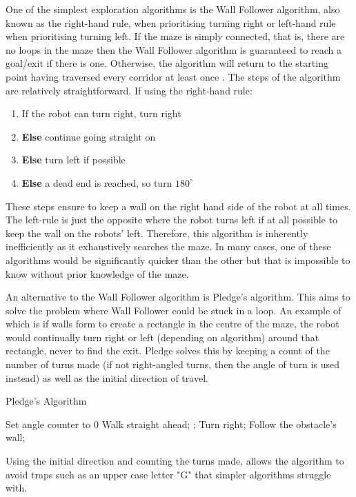 One of the simplest exploration algorithms is the Wall Follower algorithm, 
also known as the right-hand rule, when prioritising turning right or 
left-hand rule when prioritising turning left. If the maze is simply 
connected, that is, there are no loops in the maze then the Wall Follower 
algorithm is guaranteed to reach a goal/exit if there is one. Otherwise, the 
algorithm will return to the starting point having traversed every corridor at 
least once \cite{wallFollowerArcBotics}. The steps of the algorithm are 
relatively straightforward. If using the right-hand rule:
\begin{enumerate}
\item If the robot can turn right, turn right
\item \textbf{Else} continue going straight on
\item \textbf{Else} turn left if possible
\item \textbf{Else} a dead end is reached, so turn $180^{\circ}$
\end{enumerate}
These steps ensure to keep a wall on the right hand side of the robot at 
all times. The left-rule is just the opposite where the robot turns left 
if at all possible to keep the wall on the robots' left. Therefore,
this algorithm is inherently inefficiently as it exhaustively searches the
maze. In many cases, one of these algorithms would be significantly quicker
than the other but that is impossible to know without prior knowledge of 
the maze.

An alternative to the Wall Follower algorithm is Pledge's algorithm. This
aims to solve the problem where Wall Follower could be stuck in a loop. An 
example of which is if walls form to create a rectangle in the centre of 
the maze, the robot would continually turn right or left (depending on
algorithm) around that rectangle, never to find the exit. Pledge solves this
by keeping a count of the number of turns made (if not right-angled turns,
then the angle of turn is used instead) as well as the initial direction of
travel. \cite{klein2011pledge}

\begin{algorithm}
\caption{Pledge's Algorithm}
\begin{algorithmic}
\STATE Set angle counter to 0
\REPEAT
\REPEAT
\STATE Walk straight ahead;
;
\STATE Turn right;
\REPEAT
\STATE Follow the obstacle's wall;
\end{algorithmic}
\end{algorithm}
Using the initial direction and counting the turns made, allows the 
algorithm to avoid traps such as an upper case letter "G" that simpler 
algorithms struggle with.

